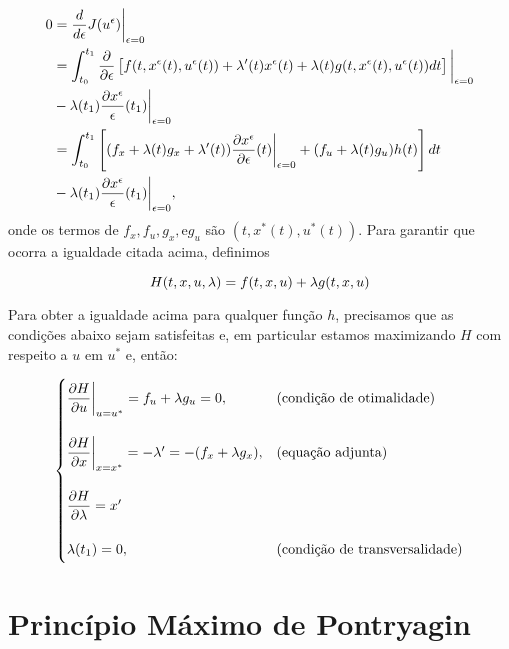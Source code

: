 \begin{equation*}
    \label{eq1}
    \begin{split}
        0 &= \frac{d}{d\epsilon} J(u^{\epsilon})\bigg\rvert_{\epsilon = 0} \\ 
        &= \int_{t_0}^{t_1} \frac{\partial}{\partial \epsilon}\left[f(t, x^{\epsilon}(t), u^{\epsilon}(t)) + \lambda '(t)x^{\epsilon}(t) + \lambda(t)g(t,x^{\epsilon}(t), u^{\epsilon}(t))dt\right]\bigg\rvert_{\epsilon = 0}\\ 
        &- \lambda(t_1)\frac{\partial x^{\epsilon}}{\epsilon}(t_1)\bigg\rvert_{\epsilon = 0} \\
        &= \int_{t_0}^{t_1} \left[(f_x + \lambda(t)g_x + \lambda '(t))\frac{\partial x^{\epsilon}}{\partial\epsilon}(t)\bigg\rvert_{\epsilon = 0} + (f_u + \lambda(t)g_u)h(t)\right]dt \\
        &- \lambda(t_1)\frac{\partial x^{\epsilon}}{\epsilon}(t_1)\bigg\rvert_{\epsilon = 0},
    \end{split}
\end{equation*}
onde os termos de $f_x, f_u, g_x, \text{e} g_u$ são $(t, x^*(t), u^*(t))$. 
Para garantir que ocorra a igualdade citada acima, definimos 

\begin{definition}[Hamiltoniano]
    \label{hamiltonian}
    \begin{equation*}
        H(t,x,u,\lambda) = f(t,x,u) + \lambda g(t, x,u)
    \end{equation*}
\end{definition}

Para obter a igualdade acima para qualquer função $h$, precisamos que as condições abaixo sejam
satisfeitas e, em particular estamos maximizando $H$ com respeito a $u$ em $u^*$ e, então: 

\begin{equation}
    \begin{cases}
        \dfrac{\partial H}{\partial u} \bigg\rvert_{u = u^{*}} = f_u + \lambda g_u = 0, &\text{(condição de otimalidade)}\\ \\
        \dfrac{\partial H}{\partial x} \bigg\rvert_{x = x^*} = - \lambda ' = -(f_x + \lambda g_x), &\text{(equação adjunta)} \\ \\
        \dfrac{\partial H}{\partial \lambda} = x' \\ \\
        \lambda(t_1) = 0, &\text{(condição de transversalidade)}
    \end{cases}    
\end{equation}

\section{Princípio Máximo de Pontryagin}
\label{pontryagin}


